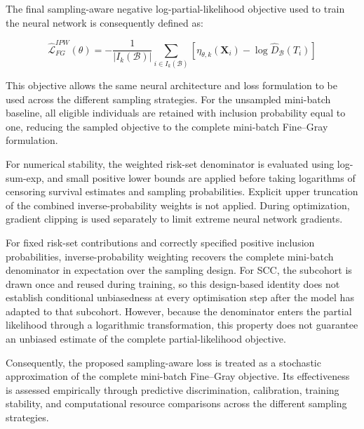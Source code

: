 \documentclass[a4paper,twoside,12pt]{report}
\begin{document}
The final sampling-aware negative log-partial-likelihood objective used to train the neural network is consequently defined as:

\begin{equation}
\boxed{
\widehat{\mathcal{L}}_{FG}^{IPW}(\theta)
=
-\frac{1}{|I_k(\mathcal{B})|}
\sum_{i \in I_k(\mathcal{B})}
\left[
\eta_{\theta,k}(\boldsymbol{X}_i)
-
\log\widehat{D}_{\mathcal{B}}(T_i)
\right]
}
\end{equation}

This objective allows the same neural architecture and loss formulation to be used across the different sampling strategies. For the unsampled mini-batch baseline, all eligible individuals are retained with inclusion probability equal to one, reducing the sampled objective to the complete mini-batch Fine--Gray formulation.

For numerical stability, the weighted risk-set denominator is evaluated using log-sum-exp, and small positive lower bounds are applied before taking logarithms of censoring survival estimates and sampling probabilities. Explicit upper truncation of the combined inverse-probability weights is not applied. During optimization, gradient clipping is used separately to limit extreme neural network gradients.

For fixed risk-set contributions and correctly specified positive inclusion probabilities, inverse-probability weighting recovers the complete mini-batch denominator in expectation over the sampling design. For SCC, the subcohort is drawn once and reused during training, so this design-based identity does not establish conditional unbiasedness at every optimisation step after the model has adapted to that subcohort. However, because the denominator enters the partial likelihood through a logarithmic transformation, this property does not guarantee an unbiased estimate of the complete partial-likelihood objective.

Consequently, the proposed sampling-aware loss is treated as a stochastic approximation of the complete mini-batch Fine--Gray objective. Its effectiveness is assessed empirically through predictive discrimination, calibration, training stability, and computational resource comparisons across the different sampling strategies.



\end{document}
